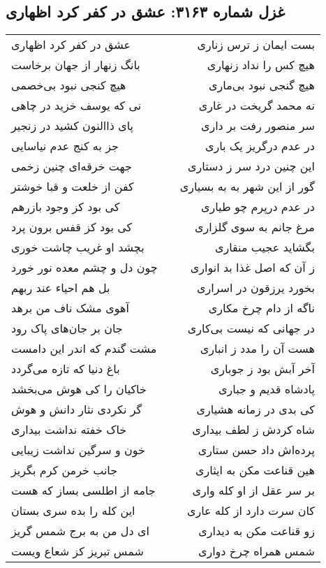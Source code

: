 \begin{center}
\section*{غزل شماره ۳۱۶۳: عشق در کفر کرد اظهاری}
\label{sec:3163}
\begin{longtable}{l p{0.5cm} r}
عشق در کفر کرد اظهاری
&&
بست ایمان ز ترس زناری
\\
بانگ زنهار از جهان برخاست
&&
هیچ کس را نداد زنهاری
\\
هیچ کنجی نبود بی‌خصمی
&&
هیچ گنجی نبود بی‌ماری
\\
نی که یوسف خزید در چاهی
&&
نه محمد گریخت در غاری
\\
پای ذاالنون کشید در زنجیر
&&
سر منصور رفت بر داری
\\
جز به کنج عدم نیاسایی
&&
در عدم درگریز یک باری
\\
جهت خرقه‌ای چنین زخمی
&&
این چنین درد سر ز دستاری
\\
کفن از خلعت و قبا خوشتر
&&
گور از این شهر به به بسیاری
\\
کی بود کز وجود بازرهم
&&
در عدم درپرم چو طیاری
\\
کی بود کز قفس برون پرد
&&
مرغ جانم به سوی گلزاری
\\
بچشد او غریب چاشت خوری
&&
بگشاید عجیب منقاری
\\
چون دل و چشم معده نور خورد
&&
ز آن که اصل غذا بد انواری
\\
بل هم احیاء عند ربهم
&&
بخورد یرزقون در اسراری
\\
آهوی مشک ناف من برهد
&&
ناگه از دام چرخ مکاری
\\
جان بر جان‌های پاک رود
&&
در جهانی که نیست بی‌کاری
\\
مشت گندم که اندر این دامست
&&
هست آن را مدد ز انباری
\\
باغ دنیا که تازه می‌گردد
&&
آخر آبش بود ز جوباری
\\
خاکیان را کی هوش می‌بخشد
&&
پادشاه قدیم و جباری
\\
گر نکردی نثار دانش و هوش
&&
کی بدی در زمانه هشیاری
\\
خاک خفته نداشت بیداری
&&
شاه کردش ز لطف بیداری
\\
خون و سرگین نداشت زیبایی
&&
پرده‌اش داد حسن ستاری
\\
جانب خرمن کرم بگریز
&&
هین قناعت مکن به ایثاری
\\
جامه از اطلسی بساز که هست
&&
بر سر عقل از او کله واری
\\
این کله را بده سری بستان
&&
کان سرت دارد از کله عاری
\\
ای دل من به برج شمس گریز
&&
زو قناعت مکن به دیداری
\\
شمس تبریز کز شعاع ویست
&&
شمس همراه چرخ دواری
\\
\end{longtable}
\end{center}
